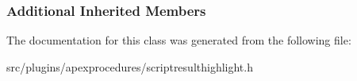 \subsubsection*{Additional Inherited Members}


The documentation for this class was generated from the following file\-:\begin{DoxyCompactItemize}
\item
src/plugins/apexprocedures/scriptresulthighlight.\-h\end{DoxyCompactItemize}
